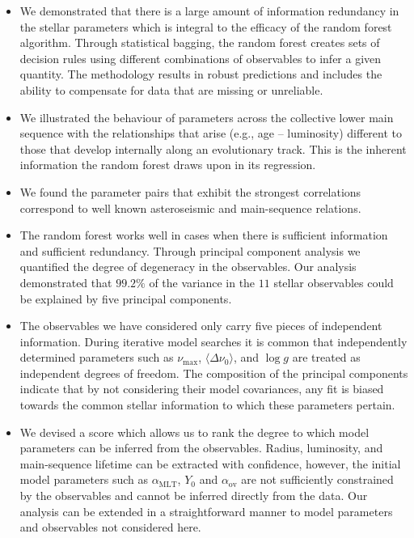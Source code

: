 \begin{itemize}
   
             \item We demonstrated that there is a large amount of information redundancy in the stellar parameters which is integral to the efficacy of the random forest algorithm. Through statistical bagging, the random forest  creates sets of decision rules using different combinations of observables to infer a given quantity. The methodology results in  robust predictions and includes the ability to compensate for data that are missing or unreliable. 
             
          \item We illustrated the behaviour of parameters across the collective lower main sequence with the relationships that arise (e.g., age -- luminosity) different to those that develop internally along an evolutionary track. This is the inherent information the random forest draws upon in its regression.
     
         \item  We found the parameter pairs that exhibit the strongest correlations correspond to well known asteroseismic and main-sequence relations.        
         
 


   \item The random forest works well in cases when there is sufficient information and sufficient redundancy.
   Through principal component analysis we quantified the degree of degeneracy in the observables. 
   Our analysis demonstrated that $99.2\%$ of the variance in the $11$ stellar observables could be explained by five principal components.
       
             
 \item The observables we have considered only carry five pieces of independent information.
             During  iterative model searches it is common that independently determined parameters such as $\nu_{\max}$, ${\langle\Delta\nu_0\rangle}$, and ${\log{} g}$ are treated as independent degrees of freedom. The composition of the principal components indicate that by not considering their model covariances, any fit is biased towards the common stellar information to which these parameters pertain.
   

  \item We devised a score  which  allows us to rank the degree to which model parameters can be inferred from the observables.  Radius, luminosity, and main-sequence lifetime can be extracted  with confidence, however, the initial model parameters such as $\alpha_{\text{MLT}}$, $Y_0$ and $\alpha_{\text{ov}}$ are not sufficiently constrained by the observables and cannot be inferred directly from the data.  Our analysis can be extended in a straightforward manner to model parameters and observables not considered here.  
  

\end{itemize}
